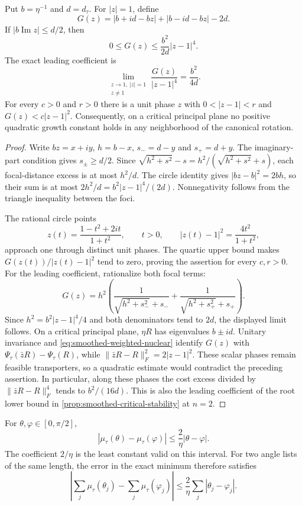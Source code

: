 \begin{proposition}
\label{prop:smoothed-critical-flatness}
Put $b=\eta^{-1}$ and $d=d_\tau$. For $|z|=1$, define
\[
 G(z)=|b+id-bz|+|b-id-bz|-2d.
\]
If $|b\operatorname{Im}z|\leq d/2$, then
\[
 0\leq G(z)\leq\frac{b^2}{2d}|z-1|^4.
\]
The exact leading coefficient is
\[
 \lim_{\substack{z\to1,\ |z|=1\\z\ne1}}
   \frac{G(z)}{|z-1|^4}=\frac{b^2}{4d}.
\]
For every $c>0$ and $r>0$ there is a unit phase $z$ with
$0<|z-1|<r$ and $G(z)<c|z-1|^2$.
Consequently, on a critical principal plane no positive quadratic growth
constant holds in any neighborhood of the canonical rotation.
\end{proposition}

\begin{proof}
Write $bz=x+iy$, $h=b-x$, $s_-=d-y$ and $s_+=d+y$.
The imaginary-part condition gives $s_\pm\geq d/2$. Since
$\sqrt{h^2+s^2}-s=h^2/(\sqrt{h^2+s^2}+s)$, each focal-distance
excess is at most $h^2/d$. The circle identity gives
$|bz-b|^2=2bh$, so their sum is at most
$2h^2/d=b^2|z-1|^4/(2d)$. Nonnegativity follows from the triangle
inequality between the foci.

The rational circle points
\[
 z(t)=\frac{1-t^2+2it}{1+t^2},\qquad t>0,
 \qquad |z(t)-1|^2=\frac{4t^2}{1+t^2},
\]
approach one through distinct unit phases. The quartic upper bound makes
$G(z(t))/|z(t)-1|^2$ tend to zero, proving the assertion for every
$c,r>0$. For the leading coefficient, rationalize both focal terms:
\[
 G(z)=h^2\left(
 \frac1{\sqrt{h^2+s_-^2}+s_-}
 +\frac1{\sqrt{h^2+s_+^2}+s_+}\right).
\]
Since $h^2=b^2|z-1|^4/4$ and both denominators tend to $2d$,
the displayed limit follows.
On a critical principal plane, $\eta R$ has eigenvalues $b\pm id$.
Unitary invariance and \cref{eq:smoothed-weighted-nuclear} identify
$G(z)$ with $\Psi_\tau(\bar z R)-\Psi_\tau(R)$, while
$\|\bar z R-R\|_F^2=2|z-1|^2$. These scalar phases remain feasible
transporters, so a quadratic estimate would contradict the preceding
assertion. In particular, along these phases the cost excess divided by
$\|\bar z R-R\|_F^4$ tends to $b^2/(16d)$. This is also the leading
coefficient of the root lower bound in
\cref{prop:smoothed-critical-stability} at $n=2$.
\end{proof}

\begin{corollary}
\label{cor:smoothed-value-sensitivity}
For $\theta,\varphi\in[0,\pi/2]$,
\[
 |\mu_\tau(\theta)-\mu_\tau(\varphi)|
 \leq\frac2\eta|\theta-\varphi|.
\]
The coefficient $2/\eta$ is the least constant valid on this interval.
For two angle lists of the same length, the error in the exact minimum
therefore satisfies
\[
 \left|\sum_j\mu_\tau(\theta_j)-\sum_j\mu_\tau(\varphi_j)\right|
 \leq\frac2\eta\sum_j|\theta_j-\varphi_j|.
\]
\end{corollary}

